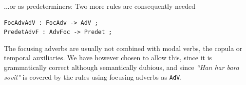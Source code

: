 \documentclass{report}
\begin{document}
...or as predeterminers:
Two more rules are consequently needed
\begin{verbatim}
FocAdvAdV : FocAdv -> AdV ;
PredetAdvF : AdvFoc -> Predet ;
\end{verbatim}



The focusing adverbs are usually not combined with modal verbs, the copula or temporal auxiliaries. 
We have however chosen to allow this, since it is grammatically correct although semantically
dubious, and since \emph{``Han har bara sovit"} is covered by the rules using focusing
adverbs as \verb-AdV-.

\end{document}
